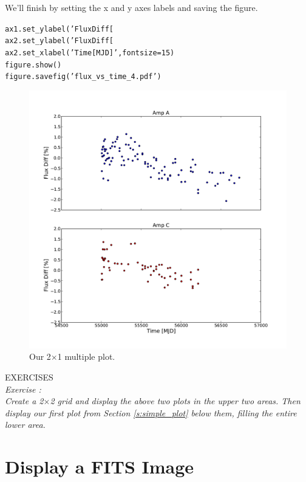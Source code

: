 We'll finish by setting the x and y axes labels and saving the figure.

\begin{alltt}
\pytab ax1.set_ylabel('Flux Diff [%
\pytab ax2.set_ylabel('Flux Diff [%
\pytab ax2.set_xlabel('Time [MJD]', fontsize=15)
\pytab figure.show()
\pytab figure.savefig('flux_vs_time_4.pdf')
\end{alltt}

\begin{figure}[tbp]
  \centering
    \includegraphics[scale=0.35]{flux_vs_time_4.pdf}
    \caption{Our 2$\times$1 multiple plot.}
  \label{fig:flux_vs_time_4}
\end{figure}

{\color{blue} {\sf\small EXERCISES}} \\
{\it Exercise  :  \\
Create a 2$\times$2 grid and display the above two plots in the upper two areas. Then display our first plot
 from Section \ref{s:simple_plot} below them, filling the entire lower area.}


\section{Display a FITS Image}\label{s:display_fits}

